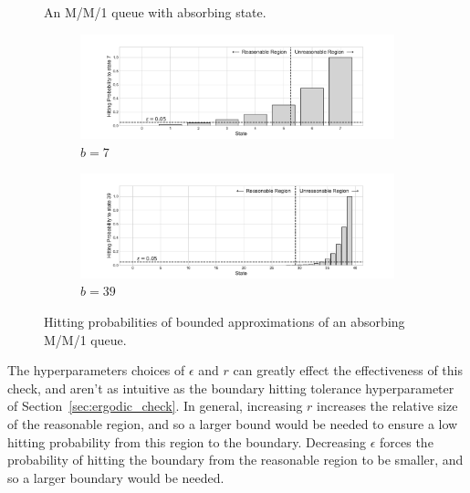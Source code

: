 \documentclass{article}
\begin{document}
\begin{figure}

\caption{An M/M/1 queue with absorbing state.}
\label{fig:mm1_absorbing}
\end{figure}

\begin{figure}[!htbp]
  \begin{center}
  \begin{subfigure}[b]{0.65\textwidth}
    \includegraphics[width=\textwidth]{img/example_absorbingmc_8states.pdf}
    \caption{$b=7$}
    \label{fig:absorbing_b7}
  \end{subfigure}
  \begin{subfigure}[b]{0.65\textwidth}
    \includegraphics[width=\textwidth]{img/example_absorbingmc_40states.pdf}
    \caption{$b=39$}
    \label{fig:absorbing_b39}
  \end{subfigure}
  \end{center}
  \caption{Hitting probabilities of bounded approximations of an absorbing
  M/M/1 queue.}
  \label{fig:absorbing_check}
\end{figure}

The hyperparameters choices of $\epsilon$ and $r$ can greatly effect the
effectiveness of this check, and aren't as intuitive as the boundary hitting
tolerance hyperparameter of Section~\ref{sec:ergodic_check}. In general,
increasing $r$ increases the relative size of the reasonable region, and so a
larger bound would be needed to ensure a low hitting probability from this
region to the boundary. Decreasing $\epsilon$ forces the probability of hitting
the boundary from the reasonable region to be smaller, and so a larger boundary
would be needed.
\end{document}
